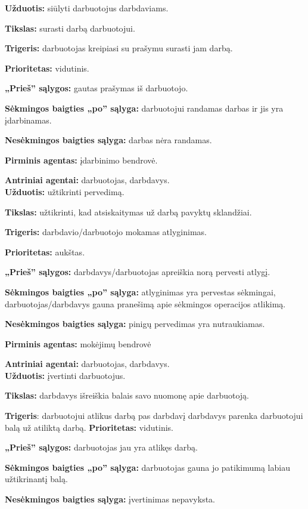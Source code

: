 \documentclass{VUMIFPSkursinis}
\begin{document}
\textbf{Užduotis:} siūlyti darbuotojus darbdaviams. 

\textbf{Tikslas:} surasti darbą darbuotojui.

\textbf{Trigeris:} darbuotojas kreipiasi su prašymu surasti jam darbą.

\textbf{Prioritetas:} vidutinis.

\textbf{„Prieš” sąlygos:} gautas prašymas iš darbuotojo.

\textbf{Sėkmingos baigties „po” sąlyga:} darbuotojui randamas darbas ir jis yra įdarbinamas.

\textbf{Nesėkmingos baigties sąlyga:} darbas nėra randamas. 

\textbf{Pirminis agentas:} įdarbinimo bendrovė.

\textbf{Antriniai agentai:} darbuotojas, darbdavys.
\\

\textbf{Užduotis:} užtikrinti pervedimą.

\textbf{Tikslas:} užtikrinti, kad atsiskaitymas už darbą pavyktų sklandžiai.

\textbf{Trigeris:} darbdavio/darbuotojo mokamas atlyginimas.

\textbf{Prioritetas:} aukštas.

\textbf{„Prieš” sąlygos:} darbdavys/darbuotojas apreiškia norą pervesti atlygį.

\textbf{Sėkmingos baigties „po” sąlyga:} atlyginimas yra pervestas sėkmingai, darbuotojas/darbdavys gauna pranešimą apie sėkmingos operacijos atlikimą.

\textbf{Nesėkmingos baigties sąlyga:} pinigų pervedimas yra nutraukiamas.

\textbf{Pirminis agentas:} mokėjimų bendrovė

\textbf{Antriniai agentai:} darbuotojas, darbdavys.
\\

\textbf{Užduotis:} įvertinti darbuotojus.

\textbf{Tikslas:} darbdavys išreiškia balais savo nuomonę apie darbuotoją.

\textbf{Trigeris}: darbuotojui atlikus darbą pas darbdavį darbdavys parenka darbuotojui balą už atiliktą darbą.
\textbf{Prioritetas:} vidutinis.

\textbf{„Prieš” sąlygos:} darbuotojas jau yra atlikęs darbą.

\textbf{Sėkmingos baigties „po” sąlyga:} darbuotojas gauna jo patikimumą labiau užtikrinantį balą.

\textbf{Nesėkmingos baigties sąlyga:} įvertinimas nepavyksta.
\end{document}
